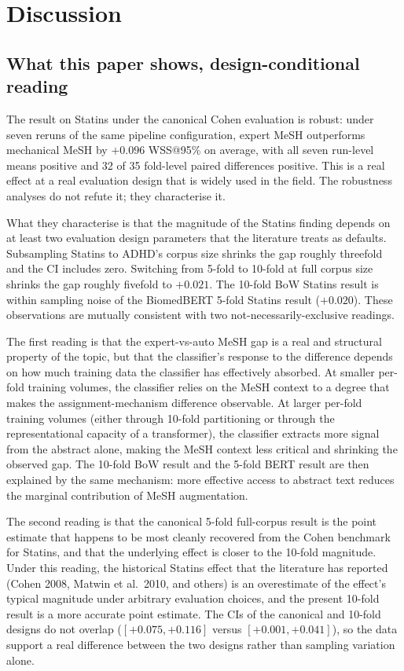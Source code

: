 \documentclass[11pt,a4paper]{article}
\begin{document}
\section{Discussion}

\subsection{What this paper shows, design-conditional reading}

The result on Statins under the canonical Cohen evaluation is robust: under seven reruns of the same pipeline configuration, expert MeSH outperforms mechanical MeSH by $+0.096$ WSS@95\% on average, with all seven run-level means positive and 32 of 35 fold-level paired differences positive. This is a real effect at a real evaluation design that is widely used in the field. The robustness analyses do not refute it; they characterise it.

What they characterise is that the magnitude of the Statins finding depends on at least two evaluation design parameters that the literature treats as defaults. Subsampling Statins to ADHD's corpus size shrinks the gap roughly threefold and the CI includes zero. Switching from 5-fold to 10-fold at full corpus size shrinks the gap roughly fivefold to $+0.021$. The 10-fold BoW Statins result is within sampling noise of the BiomedBERT 5-fold Statins result ($+0.020$). These observations are mutually consistent with two not-necessarily-exclusive readings.

The first reading is that the expert-vs-auto MeSH gap is a real and structural property of the topic, but that the classifier's response to the difference depends on how much training data the classifier has effectively absorbed. At smaller per-fold training volumes, the classifier relies on the MeSH context to a degree that makes the assignment-mechanism difference observable. At larger per-fold training volumes (either through 10-fold partitioning or through the representational capacity of a transformer), the classifier extracts more signal from the abstract alone, making the MeSH context less critical and shrinking the observed gap. The 10-fold BoW result and the 5-fold BERT result are then explained by the same mechanism: more effective access to abstract text reduces the marginal contribution of MeSH augmentation.

The second reading is that the canonical 5-fold full-corpus result is the point estimate that happens to be most cleanly recovered from the Cohen benchmark for Statins, and that the underlying effect is closer to the 10-fold magnitude. Under this reading, the historical Statins effect that the literature has reported (Cohen 2008, Matwin et al.\ 2010, and others) is an overestimate of the effect's typical magnitude under arbitrary evaluation choices, and the present 10-fold result is a more accurate point estimate. The CIs of the canonical and 10-fold designs do not overlap ($[+0.075, +0.116]$ versus $[+0.001, +0.041]$), so the data support a real difference between the two designs rather than sampling variation alone.
\end{document}
